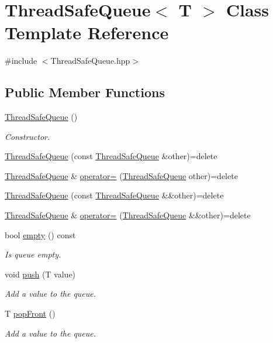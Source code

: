 \hypertarget{class_thread_safe_queue}{}\section{Thread\+Safe\+Queue$<$ T $>$ Class Template Reference}
\label{class_thread_safe_queue}


{\ttfamily \#include $<$Thread\+Safe\+Queue.\+hpp$>$}

\subsection*{Public Member Functions}
\begin{DoxyCompactItemize}
\item 
\hyperlink{class_thread_safe_queue_a06e14823003cc9b5d9e9151380077f08}{Thread\+Safe\+Queue} ()
\begin{DoxyCompactList}\small\item\em Constructor. \end{DoxyCompactList}\item 
\hyperlink{class_thread_safe_queue_a0f3f492104e38b019a5e1a74647cec39}{Thread\+Safe\+Queue} (const \hyperlink{class_thread_safe_queue}{Thread\+Safe\+Queue} \&other)=delete
\item 
\hyperlink{class_thread_safe_queue}{Thread\+Safe\+Queue} \& \hyperlink{class_thread_safe_queue_a6efd6d8c1d87c21d5bb422e18775e410}{operator=} (\hyperlink{class_thread_safe_queue}{Thread\+Safe\+Queue} other)=delete
\item 
\hyperlink{class_thread_safe_queue_a51c1e1c4eb980e2cb5d3012de447bbd5}{Thread\+Safe\+Queue} (const \hyperlink{class_thread_safe_queue}{Thread\+Safe\+Queue} \&\&other)=delete
\item 
\hyperlink{class_thread_safe_queue}{Thread\+Safe\+Queue} \& \hyperlink{class_thread_safe_queue_a10875bf953a8841619ba5bfa92e618be}{operator=} (\hyperlink{class_thread_safe_queue}{Thread\+Safe\+Queue} \&\&other)=delete
\item 
bool \hyperlink{class_thread_safe_queue_a58b5532baa6110071f697ad1f9bfbf58}{empty} () const
\begin{DoxyCompactList}\small\item\em Is queue empty. \end{DoxyCompactList}\item 
void \hyperlink{class_thread_safe_queue_a3577c6ce241a6d20895ca7c53e19159c}{push} (T value)
\begin{DoxyCompactList}\small\item\em Add a value to the queue. \end{DoxyCompactList}\item 
T \hyperlink{class_thread_safe_queue_a16adc591a14f9ed797dab4417c7ce0be}{pop\+Front} ()
\begin{DoxyCompactList}\small\item\em Add a value to the queue. \end{DoxyCompactList}\end{DoxyCompactItemize}

